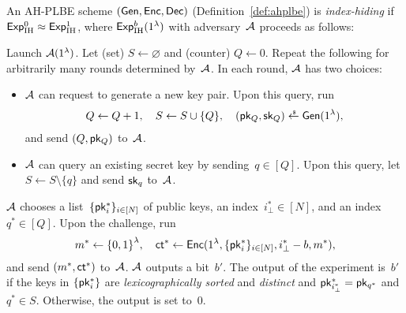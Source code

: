 \begin{definition}\label{def:ahplbe-index-hiding}
An AH-PLBE scheme $({\smash{\mathsf{Gen}}},{\smash{\mathsf{Enc}}},{\smash{\mathsf{Dec}}})$ (Definition~\ref{def:ahplbe})
is \emph{index-hiding} if ${{\smash{\mathsf{Exp}}_{\textup{IH}}^{0}}\approx{\smash{\mathsf{Exp}}_{\textup{IH}}^{1}}}$,
where ${\smash{\mathsf{Exp}}_{\textup{IH}}^{b}}(1^\lambda)$ with adversary~${\mathcal{A}}$ proceeds as follows:
\begin{security}
Launch ${\mathcal{A}}(1^\lambda)$.
Let (set) ${S\gets\varnothing}$ and (counter) ${Q\gets 0}$.
Repeat the following for arbitrarily many rounds determined by~${\mathcal{A}}$.
In each round, ${\mathcal{A}}$ has two choices:
\begin{itemize}
\item ${\mathcal{A}}$ can request to generate a new key pair.
Upon this query, run
\begin{align*}
Q\gets Q+1,\quad
S\gets S\cup\{Q\},\quad
(\pk_Q,\sk_Q)\draws\Gen(1^\lambda),
\end{align*}
and send $(Q,{\smash{\mathsf{pk}}}_Q)$ to~${\mathcal{A}}$.
\item ${\mathcal{A}}$ can query an existing secret key by sending~${q\in[Q]}$.
Upon this query, let
${
S\gets S\setminus\{q\}
}$
and send ${\smash{\mathsf{sk}}}_q$ to~${\mathcal{A}}$.
\end{itemize}
${\mathcal{A}}$ chooses
a list~$\{{\smash{\mathsf{pk}}}_i^\ast\}_{i\in[N]}$ of public keys,
an index~${i_\bot^\ast\in[N]}$, and
an index~${q^\ast\in[Q]}$.
Upon the challenge, run
\begin{align*}
m^\ast\gets\bit^\lambda,\quad
\ct^\ast\gets\Enc(1^\lambda,\{\pk_i^\ast\}_{i\in[N]},i_\bot^\ast-b,m^\ast),
\end{align*}
and send $(m^\ast,{\smash{\mathsf{ct}}}^\ast)$ to~${\mathcal{A}}$.
${\mathcal{A}}$ outputs a bit~$b'$.
The output of the experiment is~$b'$ if
the keys in $\{{\smash{\mathsf{pk}}}_i^\ast\}$ are \emph{lexicographically sorted} and \emph{distinct} and
${\pk_{i_\bot^\ast}^\ast=\pk_{q^\ast}}$ and ${q^\ast\in S}$.
Otherwise, the output is set to~$0$.
\end{security}
\end{definition}
